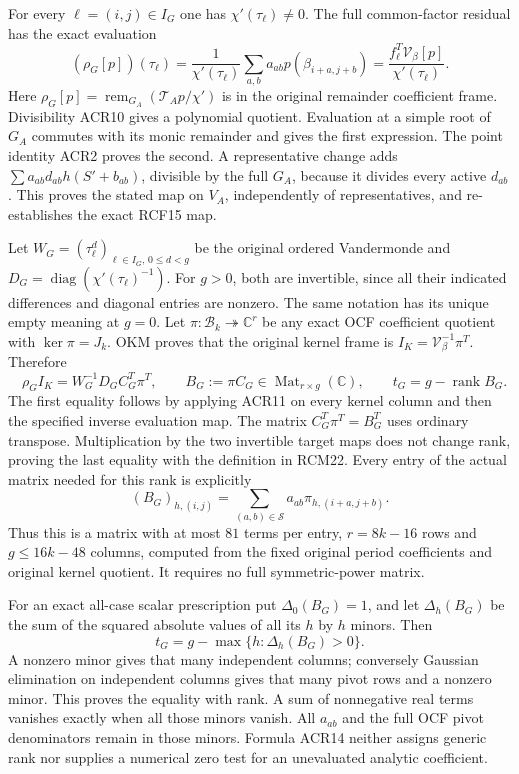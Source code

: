 \documentclass[11pt,a4paper]{article}
\begin{document}
For every $\ell=(i,j)\in I_G$ one has $\chi'(\tau_\ell)\ne0$.
The full common-factor residual has the exact evaluation
\[
 \boxed{\quad
 (\rho_G[p])(\tau_\ell)
   =\frac{1}{\chi'(\tau_\ell)}
        \sum_{a,b}a_{ab}p(\beta_{i+a,j+b})
   =\frac{f_\ell^T\mathcal V_\beta[p]}{\chi'(\tau_\ell)}.
 \quad}\tag{ACR11}
\]
Here $\rho_G[p]=\operatorname{rem}_{G_A}
 (\mathcal T_Ap/\chi')$ is in the original remainder
coefficient frame. Divisibility ACR10 gives a polynomial
quotient. Evaluation at a simple root of $G_A$ commutes
with its monic remainder and gives the first expression.
The point identity ACR2 proves the second. A representative
change adds $\sum a_{ab}d_{ab}h(S'+b_{ab})$, divisible by
the full $G_A$, because it divides every active $d_{ab}$.
This proves the stated map on $V_A$, independently of
representatives, and re-establishes the exact RCF15 map.

Let $W_G=(\tau_\ell^d)_{\ell\in I_G,\,0\leq d<g}$
be the original ordered Vandermonde and
$D_G=\operatorname{diag}(\chi'(\tau_\ell)^{-1})$.
For $g>0$, both are invertible, since all their indicated
differences and diagonal entries are nonzero. The same
notation has its unique empty meaning at $g=0$.
Let $\pi:\mathcal B_k\twoheadrightarrow\mathbb C^r$
be any exact OCF coefficient quotient with $\ker\pi=J_k$.
OKM proves that the original kernel frame is
$I_K=\mathcal V_\beta^{-1}\pi^T$. Therefore
\[
 \boxed{\quad
 \rho_G I_K=W_G^{-1}D_G C_G^T\pi^T,
 \qquad B_G:=\pi C_G\in\operatorname{Mat}_{r\times g}(\mathbb C),
 \qquad t_G=g-\operatorname{rank}B_G.
 \quad}\tag{ACR12}
\]
The first equality follows by applying ACR11 on every
kernel column and then the specified inverse evaluation
map. The matrix $C_G^T\pi^T=B_G^T$ uses ordinary
transpose. Multiplication by the two invertible target
maps does not change rank, proving the last equality
with the definition in RCM22. Every entry of the actual
matrix needed for this rank is explicitly
\[
 (B_G)_{h,(i,j)}=\sum_{(a,b)\in\mathcal S}
                       a_{ab}\pi_{h,(i+a,j+b)}.
 \tag{ACR13}
\]
Thus this is a matrix with at most $81$ terms per entry,
$r=8k-16$ rows and $g\leq16k-48$ columns, computed from
the fixed original period coefficients and original kernel
quotient. It requires no full symmetric-power matrix.

For an exact all-case scalar prescription put
$\Delta_0(B_G)=1$, and let $\Delta_h(B_G)$ be the sum
of the squared absolute values of all its $h$ by $h$ minors.
Then
\[
 t_G=g-\max\{h:\Delta_h(B_G)>0\}.
 \tag{ACR14}
\]
A nonzero minor gives that many independent columns;
conversely Gaussian elimination on independent columns
gives that many pivot rows and a nonzero minor. This
proves the equality with rank. A sum of nonnegative real
terms vanishes exactly when all those minors vanish.
All $a_{ab}$ and the full OCF pivot denominators remain
in those minors. Formula ACR14 neither assigns generic
rank nor supplies a numerical zero test for an unevaluated
analytic coefficient.
\end{document}
